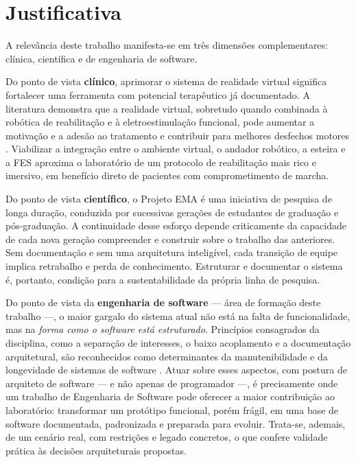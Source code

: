 \section{Justificativa}

A relevância deste trabalho manifesta-se em três dimensões complementares: clínica,
científica e de engenharia de software.

Do ponto de vista \textbf{clínico}, aprimorar o sistema de realidade virtual significa
fortalecer uma ferramenta com potencial terapêutico já documentado. A literatura
demonstra que a realidade virtual, sobretudo quando combinada à robótica de
reabilitação e à eletroestimulação funcional, pode aumentar a motivação e a adesão ao
tratamento e contribuir para melhores desfechos motores \cite{loureiro2024,macchitella2023}.
Viabilizar a integração entre o ambiente virtual, o andador robótico, a esteira e a FES
aproxima o laboratório de um protocolo de reabilitação mais rico e imersivo, em
benefício direto de pacientes com comprometimento de marcha.

Do ponto de vista \textbf{científico}, o Projeto EMA é uma iniciativa de pesquisa de
longa duração, conduzida por sucessivas gerações de estudantes de graduação e
pós-graduação. A continuidade desse esforço depende criticamente da capacidade de cada
nova geração compreender e construir sobre o trabalho das anteriores. Sem documentação e
sem uma arquitetura inteligível, cada transição de equipe implica retrabalho e perda de
conhecimento. Estruturar e documentar o sistema é, portanto, condição para a
sustentabilidade da própria linha de pesquisa.

Do ponto de vista da \textbf{engenharia de software} --- área de formação deste trabalho
---, o maior gargalo do sistema atual não está na falta de funcionalidade, mas na
\emph{forma como o software está estruturado}. Princípios consagrados da disciplina,
como a separação de interesses, o baixo acoplamento e a documentação arquitetural, são
reconhecidos como determinantes da manutenibilidade e da longevidade de sistemas de
software \cite{sommerville2011}. Atuar sobre esses aspectos, com postura de arquiteto de
software --- e não apenas de programador ---, é precisamente onde um trabalho de
Engenharia de Software pode oferecer a maior contribuição ao laboratório: transformar um
protótipo funcional, porém frágil, em uma base de software documentada, padronizada e
preparada para evoluir. Trata-se, ademais, de um cenário real, com restrições e legado
concretos, o que confere validade prática às decisões arquiteturais propostas.

